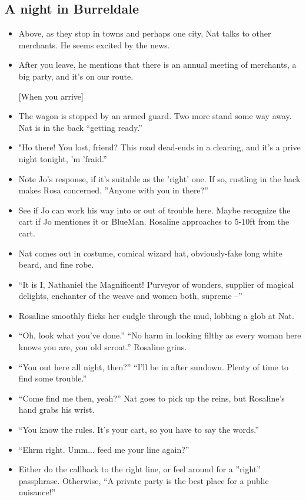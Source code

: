 \begin{multicols}{2}
\subsection{A night in Burreldale}
  \begin{itemize}
  \item Above, as they stop in towns and perhaps one city, Nat talks to other merchants.
        He seems excited by the news.
  \item After you leave, he mentions that there is an annual meeting of merchants, a big party, and it's on our route.
  \item[] [When you arrive]
  \item The wagon is stopped by an armed guard.
        Two more stand some way away.
        Nat is in the back ``getting ready.''
  \item "Ho there!  You lost, friend?  This road dead-ends in a clearing, and it's a prive night tonight, 'm 'fraid.''  
  \item Note Jo's response, if it's suitable as the 'right' one.  If so, rustling in the back makes Rosa concerned.  ''Anyone with you in there?''
  \item See if Jo can work his way into or out of trouble here.  Maybe recognize the cart if Jo mentiones it or BlueMan.  Rosaline approaches to 5-10ft from the cart.
  \item Nat comes out in costume, comical wizard hat, obviously-fake long white beard, and fine robe.
  \item ``It is I, Nathaniel the Magnificent!  Purveyor of wonders, supplier of magical delights, enchanter of the weave and women both, supreme --''
  \item Rosaline smoothly flicks her cudgle through the mud, lobbing a glob at Nat.
  \item ``Oh, look what you've done.''  ``No harm in looking filthy as every woman here knows you are, you old scroat.''  Rosaline grins.
  \item ``You out here all night, then?''  ``I'll be in after sundown.  Plenty of time to find some trouble.''
  \item ``Come find me then, yeah?''  Nat goes to pick up the reins, but Rosaline's hand grabs his wrist.
  \item ``You know the rules.  It's your cart, so you have to say the words.''
  \item ``Ehrm right.  Umm... feed me your line again?''
  \item Either do the callback to the right line, or feel around for a ''right'' passphrase.  Otherwise, ``A private party is the best place for a public nuisance!''
  \end{itemize}
\end{multicols}
